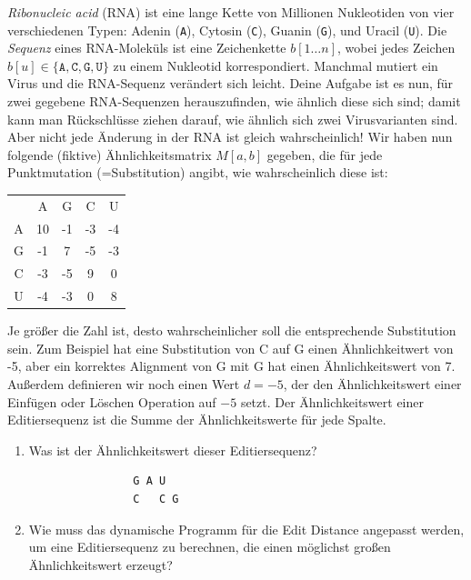 \documentclass{uebung_cs}
\begin{document}
\begin{aufgabe}[RNA]
    \emph{Ribonucleic acid} (RNA) ist eine lange Kette von Millionen Nukleotiden von vier verschiedenen Typen:
    Adenin (\verb|A|), Cytosin (\verb|C|), Guanin (\verb|G|), und Uracil (\verb|U|). Die \emph{Sequenz} eines RNA-Moleküls ist eine Zeichenkette $b[1\dots n]$, wobei jedes Zeichen $b[u]\in\{\texttt{A}, \texttt{C}, \texttt{G}, \texttt{U}\}$ zu einem Nukleotid korrespondiert.
        Manchmal mutiert ein Virus und die RNA-Sequenz verändert sich leicht. Deine Aufgabe ist es nun, für zwei gegebene RNA-Sequenzen herauszufinden, wie ähnlich diese sich sind; damit kann man Rückschlüsse ziehen darauf, wie ähnlich sich zwei Virusvarianten sind. Aber nicht jede Änderung in der RNA ist gleich wahrscheinlich! Wir haben nun folgende (fiktive) Ähnlichkeitsmatrix $M[a,b]$ gegeben, die für jede Punktmutation (=Substitution) angibt, wie wahrscheinlich diese ist:

        \begin{tabular}{ccccc}
             & A  & G &  C & U\\
           A & 10 &-1 & -3 & -4\\
           G & -1 & 7 & -5 & -3\\
           C & -3 &-5 &  9 &  0\\
           U & -4 &-3 &  0 &  8\\
        \end{tabular}

        Je größer die Zahl ist, desto wahrscheinlicher soll die entsprechende Substitution sein.
        Zum Beispiel hat eine Substitution von C auf G einen Ähnlichkeitwert von -5, aber ein korrektes Alignment von G mit G hat einen Ähnlichkeitswert von 7.
        Außerdem definieren wir noch einen Wert $d=-5$, der den Ähnlichkeitswert einer Einfügen oder Löschen Operation auf $-5$ setzt.
        Der Ähnlichkeitswert einer Editiersequenz ist die Summe der Ähnlichkeitswerte für jede Spalte.
        \begin{enumerate}
            \item\bestehen Was ist der Ähnlichkeitswert dieser Editiersequenz?
            \begin{verbatim}
                G A U  
                C   C G
            \end{verbatim}
            \item\mittel Wie muss das dynamische Programm für die Edit Distance angepasst werden, um eine Editiersequenz zu berechnen, die einen möglichst großen Ähnlichkeitswert erzeugt?
        \end{enumerate}
\end{aufgabe}
\end{document}
